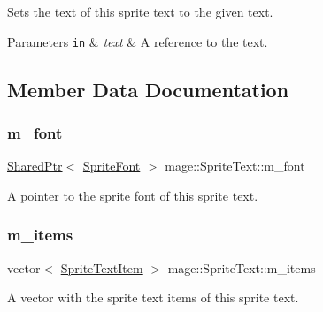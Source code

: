 Sets the text of this sprite text to the given text.


\begin{DoxyParams}[1]{Parameters}
\mbox{\tt in}  & {\em text} & A reference to the text. \\
\hline
\end{DoxyParams}


\subsection{Member Data Documentation}
\hypertarget{classmage_1_1_sprite_text_a922e37fbcbc431e815ebabe82e4528b0}{}\label{classmage_1_1_sprite_text_a922e37fbcbc431e815ebabe82e4528b0} 
\subsubsection{\texorpdfstring{m\+\_\+font}{m\_font}}
{\footnotesize\ttfamily \hyperlink{namespacemage_a1e01ae66713838a7a67d30e44c67703e}{Shared\+Ptr}$<$ \hyperlink{classmage_1_1_sprite_font}{Sprite\+Font} $>$ mage\+::\+Sprite\+Text\+::m\+\_\+font\hspace{0.3cm}{\ttfamily [private]}}

A pointer to the sprite font of this sprite text. \hypertarget{classmage_1_1_sprite_text_a5990cef53a24dcd6d6bf0ff550145ca4}{}\label{classmage_1_1_sprite_text_a5990cef53a24dcd6d6bf0ff550145ca4} 
\subsubsection{\texorpdfstring{m\+\_\+items}{m\_items}}
{\footnotesize\ttfamily vector$<$ \hyperlink{structmage_1_1_sprite_text_item}{Sprite\+Text\+Item} $>$ mage\+::\+Sprite\+Text\+::m\+\_\+items\hspace{0.3cm}{\ttfamily [private]}}

A vector with the sprite text items of this sprite text. 